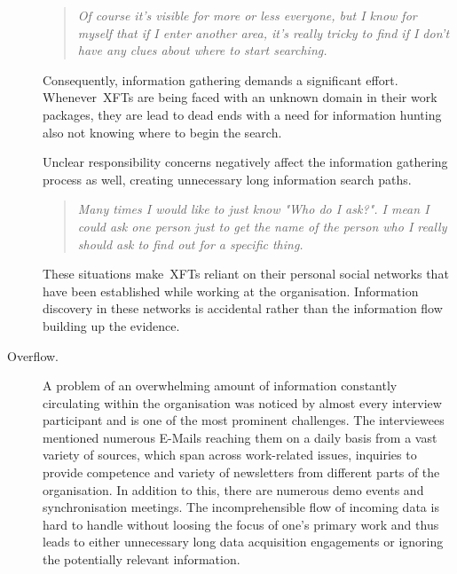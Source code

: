 \begin{description}
      \begin{quote}\itshape Of course it's visible for more or less everyone, but I know for myself that if I enter another area, it's really tricky to find if I don't have any clues about where to start searching.
      \end{quote}

   Consequently, information gathering demands a significant effort. Whenever~\acp{XFT} are being faced with an unknown domain in their work packages, they are lead to dead ends with a need for information hunting also not knowing where to begin the search.

   Unclear responsibility concerns negatively affect the information gathering process as well, creating unnecessary long information search paths.

      \begin{quote}\itshape Many times I would like to just know "Who do I ask?". I mean I could ask one person just to get the name of the person who I really should ask to find out for a specific thing.
      \end{quote}
      
   These situations make~\acp{XFT} reliant on their personal social networks that have been established while working at the organisation. Information discovery in these networks is accidental rather than the information flow building up the evidence.


   \item[Overflow.] A problem of an overwhelming amount of information constantly circulating within the organisation was noticed by almost every interview participant and is one of the most prominent challenges. The interviewees mentioned numerous E-Mails reaching them on a daily basis from a vast variety of sources, which span across work-related issues, inquiries to provide competence and variety of newsletters from different parts of the organisation. In addition to this, there are numerous demo events and synchronisation meetings. The incomprehensible flow of incoming data is hard to handle without loosing the focus of one's primary work and thus leads to either unnecessary long data acquisition engagements or ignoring the potentially relevant information.
   

\end{description}

